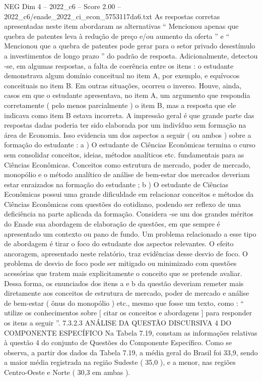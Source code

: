 \begin{textsample}{NEG Dim 4 – 2022\_c6 – Score 2.00 – 2022\_c6/enade\_2022\_ci\_econ\_5753117da6.txt}
As respostas corretas apresentadas neste item abordaram as alternativas “ Mencionou apenas que quebra de patentes leva à redução de preço e/ou aumento da oferta ” e “ Mencionou que a quebra de patentes pode gerar para o setor privado desestímulo a investimentos de longo prazo ” do padrão de resposta.
Adicionalmente, detectou -se, em algumas respostas, a falta de coerência entre os itens : o estudante demonstrava algum domínio conceitual no item A, por exemplo, e equívocos conceituais no item B.
Em outras situações, ocorreu o inverso.
Houve, ainda, casos em que o estudante apresentava, no item A, um argumento que respondia corretamente ( pelo menos parcialmente ) o item B, mas a resposta que ele indicava como item B estava incorreta.
A impressão geral é que grande parte das respostas dadas poderia ter sido elaborada por um indivíduo sem formação na área de Economia.
Isso evidencia um dos aspectos a seguir ( ou ambos ) sobre a formação do estudante : a ) O estudante de Ciências Econômicas termina o curso sem consolidar conceitos, ideias, métodos analíticos etc. fundamentais para as Ciências Econômicas.
Conceitos como estrutura de mercado, poder de mercado, monopólio e o método analítico de análise de bem-estar dos mercados deveriam estar enraizados na formação do estudante ; b ) O estudante de Ciências Econômicas possui uma grande dificuldade em relacionar conceitos e métodos da Ciências Econômicas com questões do cotidiano, podendo ser reflexo de uma deficiência na parte aplicada da formação.
Considera -se um dos grandes méritos do Enade sua abordagem de elaboração de questões, em que sempre é apresentado um contexto ou pano de fundo.
Um problema relacionado a esse tipo de abordagem é tirar o foco do estudante dos aspectos relevantes.
O efeito ancoragem, apresentado neste relatório, traz evidências desse desvio de foco.
O problema de desvio de foco pode ser mitigado ou minimizado com questões acessórias que tratem mais explicitamente o conceito que se pretende avaliar.
Dessa forma, os enunciados dos itens a e b da questão deveriam remeter mais diretamente aos conceitos de estrutura de mercado, poder de mercado e análise de bem-estar ( ônus do monopólio ) etc., mesmo que fosse um texto, como : “ utilize os conhecimentos sobre [ citar os conceitos e abordagens ] para responder os itens a seguir ”. 7.3.2.3 ANÁLISE DA QUESTÃO DISCURSIVA 4 DO COMPONENTE ESPECÍFICO Na Tabela 7.19, constam as informações relativas à questão 4 do conjunto de Questões do Componente Específico.
Como se observa, a partir dos dados da Tabela 7.19, a média geral do Brasil foi 33,9, sendo a maior média registrada na região Sudeste ( 35,0 ), e a menor, nas regiões Centro-Oeste e Norte ( 30,3 em ambas ).

\end{textsample}
